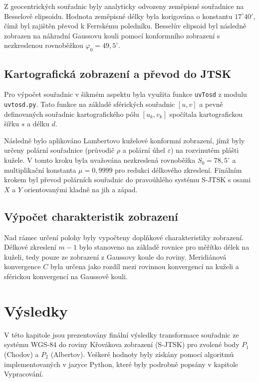 \documentclass[12pt]{article}
\begin{document}
Z geocentrických souřadnic byly analyticky odvozeny zeměpisné souřadnice na Besselově elipsoidu. Hodnota zeměpisné délky byla korigována o konstantu $17^\circ 40'$, čímž byl zajištěn převod k Ferrskému poledníku. Besselův elipsoid byl následně zobrazen na náhradní Gaussovu kouli pomocí konformního zobrazení s nezkreslenou rovnoběžkou $\varphi_0 = 49,5^\circ$.

\subsection{Kartografická zobrazení a převod do JTSK}
Pro výpočet souřadnic v šikmém aspektu byla využita funkce \texttt{uvTosd} z modulu \texttt{uvtosd.py}. Tato funkce na základě sférických souřadnic $[u, v]$ a pevně definovaných souřadnic kartografického pólu $[u_k, v_k]$ spočítala kartografickou šířku $s$ a délku $d$.

Následně bylo aplikováno Lambertovo kuželové konformní zobrazení, jímž byly určeny polární souřadnice (průvodič $\rho$ a polární úhel $\varepsilon$) na rozvinutém plášti kužele. V tomto kroku byla uvažována nezkreslená rovnoběžka $S_0 = 78,5^\circ$ a multiplikační konstanta $\mu = 0,9999$ pro redukci délkového zkreslení. Finálním krokem byl převod polárních souřadnic do pravoúhlého systému S-JTSK s osami $X$ a $Y$ orientovanými kladně na jih a západ.

\subsection{Výpočet charakteristik zobrazení}
Nad rámec určení polohy byly vypočteny doplňkové charakteristiky zobrazení. Délkové zkreslení $m-1$ bylo stanoveno na základě rovnice pro měřítko délek na kuželi, tedy pouze ze zobrazení z Gaussovy koule do roviny. Meridiánová konvergence $C$ byla určena jako rozdíl mezi rovinnou konvergencí na kuželi a sférickou konvergencí na Gaussově kouli.

\newpage
\section{Výsledky}

V této kapitole jsou prezentovány finální výsledky transformace souřadnic ze systému WGS-84 do roviny Křovákova zobrazení (S-JTSK) pro zvolené body $P_1$ (Chodov) a $P_2$ (Albertov). Veškeré hodnoty byly získány pomocí algoritmů implementovaných v jazyce Python, které byly podrobně popsány v kapitole Vypracování.
\end{document}
